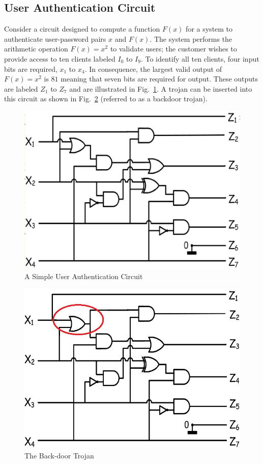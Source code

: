\documentclass[journal, hidelinks]{IEEEtran}
\begin{document}
\subsection{User Authentication Circuit} \label{sec:userAuthentication}
Consider a circuit designed to compute a function $F(x)$ for a system to authenticate user-password pairs $x$ and $F(x)$.
The system performs the arithmetic operation $F(x) = x^2$ to validate users; the customer wishes to provide access to ten clients labeled $I_0$ to $I_9$.
To identify all ten clients, four input bits are required, $x_1$ to $x_4$.
In consequence, the largest valid output of $F(x) = x^2$ is $81$ meaning that seven bits are required for output. 
These outputs are labeled $Z_1$ to $Z_7$ and are illustrated in Fig.~\ref{fig:userAuthenticationCircuit}.
A trojan can be inserted into this circuit as shown in Fig.~\ref{fig:userAuthenticationCircuitTrojan} (referred to as a backdoor trojan).
\begin{figure}[h]
	\centering
	\includegraphics[width=0.7\linewidth]{Figures/circuit1}
	\caption{A Simple User Authentication Circuit}
	\label{fig:userAuthenticationCircuit}
\end{figure}
\begin{figure}[h]
	\centering
	\includegraphics[width=0.7\linewidth]{Figures/circuit2}
	\caption{The Back-door Trojan}
	\label{fig:userAuthenticationCircuitTrojan}
\end{figure}
\end{document}
